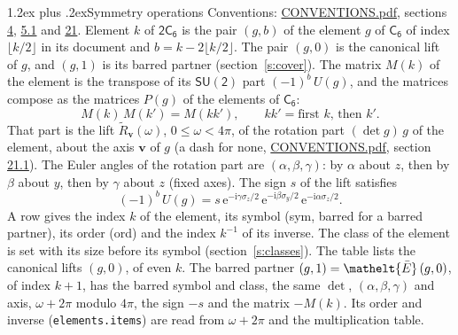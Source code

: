\documentclass[10pt,a4paper]{article}
\makeatletter
\renewcommand\section{\@startsection{section}{1}{\z@}{-3ex plus -1ex minus -.2ex}%
  {1.2ex plus .2ex}{\normalfont\large\sffamily\bfseries\color{parttitle}}}
\numberwithin{equation}{section}
\newcommand{\eltfont}[1]{{\let\sigma\eltsigma\mathelt{#1}}}
\newcommand{\grp}[1]{\mathsf{#1}}
\newcommand{\elt}[1]{\eltfont{#1}}
\newcommand{\vv}{\mathbf{v}}
\newcommand{\iunit}{\mathrm{i}}
\newcommand{\expe}{\mathrm{e}}
\newcommand{\barred}[1]{\bar{#1}}
\newcommand{\lift}[1]{\tilde{#1}}
\newcommand{\pauli}[1]{\sigma_{#1}}
\makeatother
\begin{document}
\section{Symmetry operations}\label{s:elements}
Conventions: \href{../../CONVENTIONS.pdf}{CONVENTIONS.pdf}, sections \href{../../../rotation/CONVENTIONS.pdf\#conv.4}{4}, \href{../../../rotation/CONVENTIONS.pdf\#conv.5.1}{5.1} and \href{../../CONVENTIONS.pdf\#conv.21}{21}.
\leavevmode\label{n:index.element}\label{n:element.g}Element $k$ of $\grp{2C_{6}}$ is the pair $(g, b)$ of the element $g$ of \href{../../../rotation/data/pdf/C6.pdf}{$\grp{C_{6}}$} of index $\lfloor k/2\rfloor$ in its document and $b = k - 2\lfloor k/2\rfloor$. The pair $(g, 0)$ is the canonical lift of $g$, and $(g, 1)$ is its barred partner (section~\ref{s:cover}). \label{n:matrix.element.pin}\label{n:matrix.element}The matrix $M(k)$ of the element is the transpose of its $\grp{SU(2)}$ part $(-1)^{b}\,U(g)$, and the matrices compose as the matrices $P(g)$ of the elements of $\grp{C_{6}}$:
\begin{equation}\label{e:mprod}M(k)\,M(k') = M(kk'),\qquad kk' = \text{first } k\text{, then } k'.\end{equation}
\leavevmode\label{n:angle.omega}\label{n:vector.axis}\label{n:vector.pole}That part is the lift $\lift{R}_{\vv}(\omega)$, $0 \le \omega < 4\pi$, of the rotation part $(\det g)\,g$ of the element, about the axis $\vv$ of $g$ (a dash for none, \href{../../CONVENTIONS.pdf}{CONVENTIONS.pdf}, section \href{../../CONVENTIONS.pdf\#conv.21.1}{21.1}). \label{n:angle.euler.alpha}\label{n:angle.euler.beta}\label{n:angle.euler.gamma}\label{n:vector.coordinates}The Euler angles of the rotation part are $(\alpha,\beta,\gamma)$: by $\alpha$ about $z$, then by $\beta$ about $y$, then by $\gamma$ about $z$ (fixed axes). \label{n:local.euler.sign}The sign $s$ of the lift satisfies
\begin{equation}\label{e:euler}(-1)^{b}\,U(g) = s\,\expe^{-\iunit\gamma\pauli{z}/2}\,\expe^{-\iunit\beta\pauli{y}/2}\,\expe^{-\iunit\alpha\pauli{z}/2}.\end{equation}
\leavevmode\label{n:index.element.inverse}\label{n:head.sym}\label{n:head.ord}A row gives the index $k$ of the element, its symbol (sym, barred for a barred partner), its order (ord) and the index $k^{-1}$ of its inverse. \label{n:head.class}The class of the element is set with its size before its symbol (section~\ref{s:classes}).
The table lists the canonical lifts $(g, 0)$, of even $k$. The barred partner $(g, 1) = \elt{\barred{E}}\,(g, 0)$, of index $k + 1$, has the barred symbol and class, the same $\det$, $(\alpha,\beta,\gamma)$ and axis, $\omega + 2\pi$ modulo $4\pi$, the sign $-s$ and the matrix $-M(k)$. Its order and inverse (\texttt{elements.items}) are read from $\omega + 2\pi$ and the multiplication table.
\end{document}

